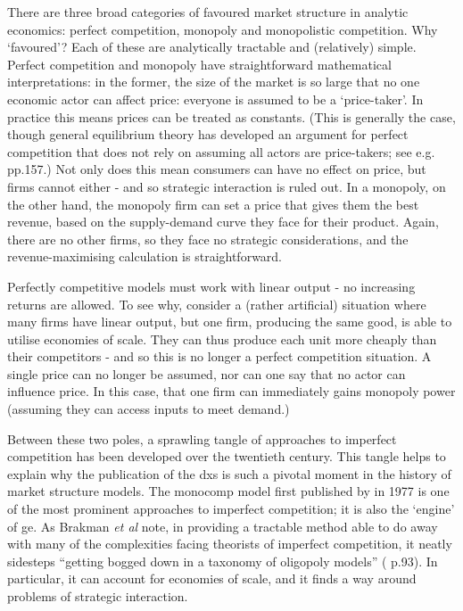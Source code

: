 There are three broad categories of favoured market structure in analytic economics: perfect competition, monopoly and monopolistic competition. Why `favoured'? Each of these are analytically tractable and (relatively) simple. Perfect competition and monopoly have straightforward mathematical interpretations: in the former, the size of the market is so large that no one economic actor can affect price: everyone is assumed to be a `price-taker'. In practice this means prices can be treated as constants. (This is generally the case, though general equilibrium theory has developed an argument for perfect competition that does not rely on assuming all actors are price-takers; see e.g. \citealt{starr_general_1997} pp.157.) Not only does this mean consumers can have no effect on price, but firms cannot either - and so strategic interaction is ruled out. In a monopoly, on the other hand, the monopoly firm can set a price that gives them the best revenue, based on the supply-demand curve they face for their product. Again, there are no other firms, so they face no strategic considerations, and the revenue-maximising calculation is straightforward.

Perfectly competitive models must work with linear output - no increasing returns are allowed. To see why, consider a (rather artificial) situation where many firms have linear output, but one firm, producing the same good, is able to utilise economies of scale. They can thus produce each unit more cheaply than their competitors - and so this is no longer a perfect competition situation. A single price can no longer be assumed, nor can one say that no actor can influence price. In this case, that one firm can immediately gains monopoly power (assuming they can access inputs to meet demand.)

Between these two poles, a sprawling tangle of approaches to imperfect competition has been developed over the twentieth century. This tangle helps to explain why the publication of the \gls{dxs} is such a pivotal moment in the history of market structure models. The \gls{monocomp} model first published by \citeauthor{dixit_monopolistic_1977} in 1977 is one of the most prominent approaches to imperfect competition; it is also the `engine' of \gls{ge}. As Brakman \emph{et al} note, in providing a tractable method able to do away with many of the complexities facing theorists of imperfect competition, it neatly sidesteps ``getting bogged down in a taxonomy of oligopoly models'' (\citealt{brakman_new_2009} p.93). In particular, it can account for economies of scale, and it finds a way around problems of strategic interaction.

